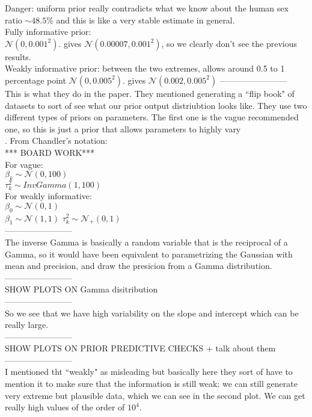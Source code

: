 \documentclass[]{article}
\begin{document}
\noindent Danger: uniform prior really contradicts what we know about the human sex ratio $\sim 48.5\%$ and this is like a very stable estimate in general.\\
\noindent Fully informative prior:\\
$\mathcal{N}(0, 0.001^2)$. gives $\mathcal{N}(0.00007, 0.001^2)$, so we clearly don't see the previous results. \\
\noindent Weakly informative prior: between the two extremes, allows around 0.5 to 1 percentage point
$\mathcal{N}(0, 0.005^2)$. gives $\mathcal{N}(0.002, 0.005^2)$
------------------------\\

This is what they do in the paper. They mentioned generating a ``flip book" of datasets to sort of see what our prior output distriubtion looks like. They use two different types of priors on parameters. The first one is the vague recommended one, so this is just a prior that allows parameters to highly vary\\. From Chandler's notation:\\
*** BOARD WORK***\\
For vague: \\
$\beta_k \sim \mathcal{N}(0,100)$\\
$\tau_k^2 \sim InvGamma(1,100)$\\
For weakly informative:\\
$\beta_0 \sim \mathcal{N}(0,1)$\\
$\beta_1 \sim \mathcal{N}(1,1)$
$\tau_k^2 \sim \mathcal{N}_{+}(0,1)$\\
------------------------\\
The inverse Gamma is basically a random variable that is the reciprocal of a Gamma, so it would have been equivalent to parametrizing the Gaussian with mean and precision, and draw the presicion from a Gamma distribution. \\
------------------------\\SHOW PLOTS ON Gamma disitribution\\  ------------------------\\
So we see that we have high variability on the slope and intercept which can be really large. \\
------------------------\\SHOW PLOTS ON PRIOR PREDICTIVE CHECKS + talk about them\\ ------------------------\\
I mentioned tht ``weakly" as misleading but basically here they sort of have to mention it to make sure that the information is still weak: we can still generate very extreme but plausible data, which we can see in the second plot. We can get really high values of the order of $10^4$. \\
\end{document}
